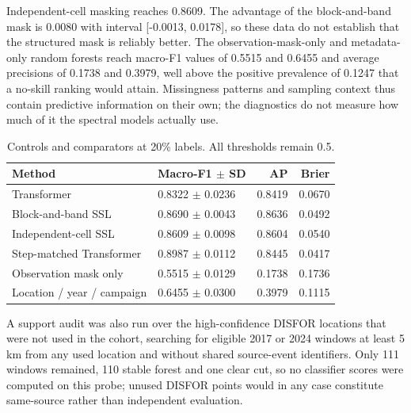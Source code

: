 \documentclass[10pt,a4paper,twocolumn]{article}
\begin{document}
Independent-cell masking reaches 0.8609. The advantage of the block-and-band mask is 0.0080 with interval [-0.0013, 0.0178], so these data do not establish that the structured mask is reliably better. The observation-mask-only and metadata-only random forests reach macro-F1 values of 0.5515 and 0.6455 and average precisions of 0.1738 and 0.3979, well above the positive prevalence of 0.1247 that a no-skill ranking would attain. Missingness patterns and sampling context thus contain predictive information on their own; the diagnostics do not measure how much of it the spectral models actually use.

\begin{table}[tbp]
\centering
\small
\caption{Controls and comparators at 20\% labels. All thresholds remain 0.5.}
\begin{tabular}{llrr}
\toprule
Method & Macro-F1 $\pm$ SD & AP & Brier \\ \midrule
Transformer & 0.8322 $\pm$ 0.0236 & 0.8419 & 0.0670 \\
Block-and-band SSL & 0.8690 $\pm$ 0.0043 & 0.8636 & 0.0492 \\
Independent-cell SSL & 0.8609 $\pm$ 0.0098 & 0.8604 & 0.0540 \\
Step-matched Transformer & 0.8987 $\pm$ 0.0112 & 0.8445 & 0.0417 \\
Observation mask only & 0.5515 $\pm$ 0.0129 & 0.1738 & 0.1736 \\
Location / year / campaign & 0.6455 $\pm$ 0.0300 & 0.3979 & 0.1115 \\
\bottomrule
\end{tabular}
\end{table}

A support audit was also run over the high-confidence DISFOR locations that were not used in the cohort, searching for eligible 2017 or 2024 windows at least 5 km from any used location and without shared source-event identifiers. Only 111 windows remained, 110 stable forest and one clear cut, so no classifier scores were computed on this probe; unused DISFOR points would in any case constitute same-source rather than independent evaluation.
\end{document}
